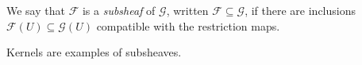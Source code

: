 \begin{definition}
    We say that \( \mathcal F \) is a \emph{subsheaf} of \( \mathcal G \), written \( \mathcal F \subseteq \mathcal G \), if there are inclusions \( \mathcal F(U) \subseteq \mathcal G(U) \) compatible with the restriction maps.
\end{definition}
Kernels are examples of subsheaves.
